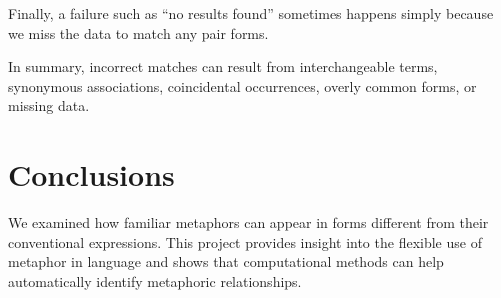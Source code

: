\documentclass[12pt,a4paper]{article}
\begin{document}
Finally, a failure such as “no results found” sometimes happens simply because we miss the data to match any pair forms.

In summary, incorrect matches can result from interchangeable terms, synonymous associations, coincidental occurrences, overly common forms, or missing data.

\section{Conclusions}
\label{sec:conclusions}

We examined how familiar metaphors can appear in forms different from their conventional expressions. This project provides insight into the flexible use of metaphor in language and shows that computational methods can help automatically identify metaphoric relationships.
\end{document}
